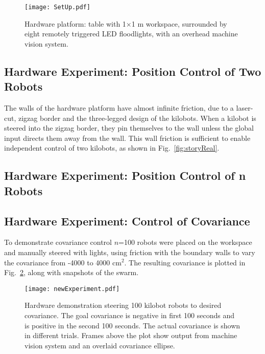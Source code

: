 \begin{figure}
\begin{center}
	\texttt{[image: SetUp.pdf]}
\end{center}
\vspace{-1em}
\caption{\label{fig:setup}
Hardware platform:  table with 1$\times$1 m workspace, surrounded by eight remotely triggered LED floodlights, with an overhead machine vision system.
}
\vspace{-1em}
\end{figure}
\subsection{Hardware Experiment: Position Control of Two Robots}
The walls of the hardware platform have almost infinite friction, due to a laser-cut, zigzag border and the three-legged design of the kilobots. When a kilobot is steered into the zigzag border, they pin themselves to the wall unless the global input directs them away from the wall.  This wall friction is sufficient to enable independent control of two kilobots, as shown in Fig.~\ref{fig:storyReal}.

\subsection{Hardware Experiment: Position Control of n Robots}


\subsection{Hardware Experiment: Control of Covariance}
To demonstrate covariance control $n$=100 robots were placed on the workspace and manually steered with lights, using friction with the boundary walls to vary the covariance from  -4000 to 4000 cm$^2$.  The resulting covariance is plotted in Fig.~\ref{fig:covExperiment}, along with snapshots of the swarm.




\begin{figure}
\begin{center}
	\texttt{[image: newExperiment.pdf]}
\end{center}
\vspace{-1em}
\caption{\label{fig:covExperiment}
Hardware demonstration steering 100 kilobot robots to desired covariance. The goal covariance is negative in first 100 seconds and is positive in the second 100 seconds. The actual covariance is shown in different trials. Frames above the plot show output from machine vision system and an overlaid covariance ellipse.
\vspace{-1em}
}
\end{figure}

